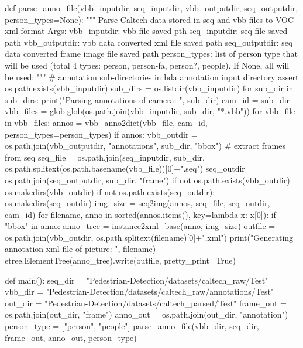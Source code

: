 \begin{pythoncode}
def parse_anno_file(vbb_inputdir, seq_inputdir, vbb_outputdir, seq_outputdir, person_types=None):
    """
    Parse Caltech data stored in seq and vbb files to VOC xml format
    Args:
        vbb_inputdir: vbb file saved pth
        seq_inputdir: seq file saved path
        vbb_outputdir: vbb data converted xml file saved path
        seq_outputdir: seq data converted frame image file saved path
        person_types: list of person type that will be used (total 4 types: person, person-fa, person?, people).
            If None, all will be used:
    """
    # annotation sub-directories in hda annotation input directory
    assert os.path.exists(vbb_inputdir)
    sub_dirs = os.listdir(vbb_inputdir)
    for sub_dir in sub_dirs:
        print("Parsing annotations of camera: ", sub_dir)
        cam_id = sub_dir
        vbb_files = glob.glob(os.path.join(vbb_inputdir, sub_dir, "*.vbb"))
        for vbb_file in vbb_files:
            annos = vbb_anno2dict(vbb_file, cam_id, person_types=person_types)
            if annos:
                vbb_outdir = os.path.join(vbb_outputdir, "annotations", sub_dir, "bbox")
                # extract frames from seq
                seq_file = os.path.join(seq_inputdir, sub_dir, os.path.splitext(os.path.basename(vbb_file))[0]+".seq")
                seq_outdir = os.path.join(seq_outputdir, sub_dir, "frame")
                if not os.path.exists(vbb_outdir):
                    os.makedirs(vbb_outdir)
                if not os.path.exists(seq_outdir):
                    os.makedirs(seq_outdir)
                img_size = seq2img(annos, seq_file, seq_outdir, cam_id)
                for filename, anno in sorted(annos.items(), key=lambda x: x[0]):
                    if "bbox" in anno:
                        anno_tree = instance2xml_base(anno, img_size)
                        outfile = os.path.join(vbb_outdir, os.path.splitext(filename)[0]+".xml")
                        print("Generating annotation xml file of picture: ", filename)
                        etree.ElementTree(anno_tree).write(outfile, pretty_print=True)

def main():    
    seq_dir = "Pedestrian-Detection/datasets/caltech_raw/Test"
    vbb_dir = "Pedestrian-Detection/datasets/caltech_raw/annotations/Test"
    out_dir = "Pedestrian-Detection/datasets/caltech_parsed/Test"
    frame_out = os.path.join(out_dir, "frame")
    anno_out = os.path.join(out_dir, "annotation")
    person_type = ["person", "people"]
    parse_anno_file(vbb_dir, seq_dir, frame_out, anno_out, person_type)
\end{pythoncode}
